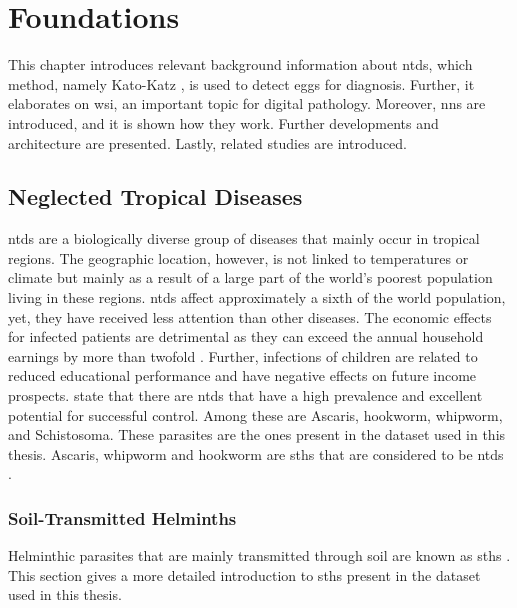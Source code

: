 \chapter{Foundations}
\label{ch:Foundations}

This chapter introduces relevant background information about \acfp{ntd}, which method, namely Kato-Katz \cite{katz1972simple}, is used to detect eggs for diagnosis. Further, it elaborates on \acf{wsi}, an important topic for digital pathology. Moreover, \acfp{nn} are introduced, and it is shown how they work. Further developments and architecture are presented. Lastly, related studies are introduced.

\section{Neglected Tropical Diseases}
\label{sec:Foundations:NTDs}

\Acfp{ntd} \cite{feasey2010neglected} are a biologically diverse group of diseases that mainly occur in tropical regions. The geographic location, however, is not linked to temperatures or climate but mainly as a result of a large part of the world's poorest population living in these regions. \Acp{ntd} affect approximately a sixth of the world population, yet, they have received less attention than other diseases. The economic effects for infected patients are detrimental as they can exceed the annual household earnings by more than twofold \cite{conteh2010socioeconomic}. Further, infections of children are related to reduced educational performance and have negative effects on future income prospects. \textcite{feasey2010neglected} state that there are \acp{ntd} that have a high prevalence and excellent potential for successful control. Among these are Ascaris, hookworm, whipworm, and Schistosoma. These parasites are the ones present in the dataset used in this thesis. Ascaris, whipworm and hookworm are \acfp{sth} that are considered to be \acp{ntd} \cite{mbongngwese2020diagnostic}. 


\subsection{Soil-Transmitted Helminths} %
\label{sec:Foundations:NTDs:STHs} 

Helminthic parasites that are mainly transmitted through soil are known as \acfp{sth} \cite{feasey2010neglected,jourdan2018soiltransmitted}. This section gives a more detailed introduction to \acp{sth} present in the dataset used in this thesis.


